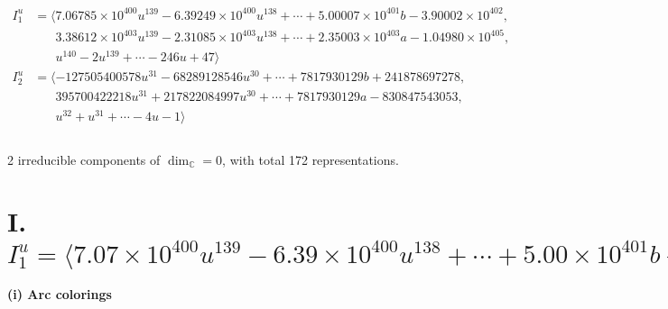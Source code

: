 \documentclass[1p]{elsarticle_modified}
\theoremstyle{definition}
\begin{document}
\begin{align*}
I^u_{1}&=\langle 
7.06785\times10^{400} u^{139}-6.39249\times10^{400} u^{138}+\cdots+5.00007\times10^{401} b-3.90002\times10^{402},\\
\phantom{I^u_{1}}&\phantom{= \langle  }3.38612\times10^{403} u^{139}-2.31085\times10^{403} u^{138}+\cdots+2.35003\times10^{403} a-1.04980\times10^{405},\\
\phantom{I^u_{1}}&\phantom{= \langle  }u^{140}-2 u^{139}+\cdots-246 u+47\rangle \\
I^u_{2}&=\langle 
-127505400578 u^{31}-68289128546 u^{30}+\cdots+7817930129 b+241878697278,\\
\phantom{I^u_{2}}&\phantom{= \langle  }395700422218 u^{31}+217822084997 u^{30}+\cdots+7817930129 a-830847543053,\\
\phantom{I^u_{2}}&\phantom{= \langle  }u^{32}+u^{31}+\cdots-4 u-1\rangle \\
\\
\end{align*}
\raggedright * 2 irreducible components of $\dim_{\mathbb{C}}=0$, with total 172 representations.\\
\newpage
\renewcommand{\arraystretch}{1}
\centering \section*{I. $I^u_{1}= \langle 7.07\times10^{400} u^{139}-6.39\times10^{400} u^{138}+\cdots+5.00\times10^{401} b-3.90\times10^{402},\;3.39\times10^{403} u^{139}-2.31\times10^{403} u^{138}+\cdots+2.35\times10^{403} a-1.05\times10^{405},\;u^{140}-2 u^{139}+\cdots-246 u+47 \rangle$}
\flushleft \textbf{(i) Arc colorings}\\
\end{document}
